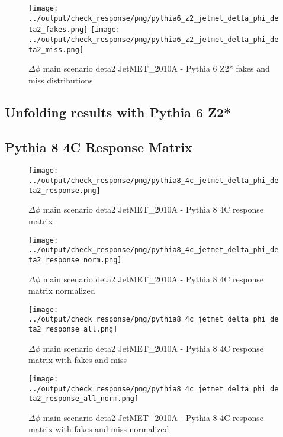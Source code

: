 \documentclass[11pt]{book}
\begin{document}
\begin{figure}[ht]
\centering
\texttt{[image: ../output/check\_response/png/pythia6\_z2\_jetmet\_delta\_phi\_deta2\_fakes.png]}
\texttt{[image: ../output/check\_response/png/pythia6\_z2\_jetmet\_delta\_phi\_deta2\_miss.png]}
\caption{$\Delta\phi$ main scenario deta2 JetMET\_2010A - Pythia 6 Z2* fakes and miss distributions}
\label{p6_jetmet_delta_phi_deta2_fakesmiss}
\end{figure}


\clearpage
\subsection{Unfolding results with Pythia 6 Z2*}


\clearpage
\subsection{Pythia 8 4C Response Matrix}


\begin{figure}[ht]
\centering
\texttt{[image: ../output/check\_response/png/pythia8\_4c\_jetmet\_delta\_phi\_deta2\_response.png]}
\caption{$\Delta\phi$ main scenario deta2 JetMET\_2010A - Pythia 8 4C response matrix}
\label{p8_jetmet_delta_phi_deta2_response}
\end{figure}

\begin{figure}[ht]
\centering
\texttt{[image: ../output/check\_response/png/pythia8\_4c\_jetmet\_delta\_phi\_deta2\_response\_norm.png]}
\caption{$\Delta\phi$ main scenario deta2 JetMET\_2010A - Pythia 8 4C response matrix normalized}
\label{p8_jetmet_delta_phi_deta2_response_norm}
\end{figure}

\begin{figure}[ht]
\centering
\texttt{[image: ../output/check\_response/png/pythia8\_4c\_jetmet\_delta\_phi\_deta2\_response\_all.png]}
\caption{$\Delta\phi$ main scenario deta2 JetMET\_2010A - Pythia 8 4C response matrix with fakes and miss}
\label{p8_jetmet_delta_phi_deta2_response_all}
\end{figure}

\begin{figure}[ht]
\centering
\texttt{[image: ../output/check\_response/png/pythia8\_4c\_jetmet\_delta\_phi\_deta2\_response\_all\_norm.png]}
\caption{$\Delta\phi$ main scenario deta2 JetMET\_2010A - Pythia 8 4C response matrix with fakes and miss normalized}
\label{p8_jetmet_delta_phi_deta2_response_all_norm}
\end{figure}
\end{document}
